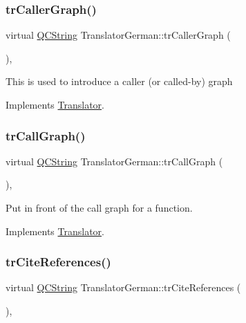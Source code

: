 \subsubsection{\texorpdfstring{trCallerGraph()}{trCallerGraph()}}
{\footnotesize\ttfamily virtual \mbox{\hyperlink{class_q_c_string}{Q\+C\+String}} Translator\+German\+::tr\+Caller\+Graph (\begin{DoxyParamCaption}{ }\end{DoxyParamCaption})\hspace{0.3cm}{\ttfamily [inline]}, {\ttfamily [virtual]}}

This is used to introduce a caller (or called-\/by) graph 

Implements \mbox{\hyperlink{class_translator}{Translator}}.

\mbox{\label{class_translator_german_af063977e045f5564f1fcaacef20dbafa}} 
\subsubsection{\texorpdfstring{trCallGraph()}{trCallGraph()}}
{\footnotesize\ttfamily virtual \mbox{\hyperlink{class_q_c_string}{Q\+C\+String}} Translator\+German\+::tr\+Call\+Graph (\begin{DoxyParamCaption}{ }\end{DoxyParamCaption})\hspace{0.3cm}{\ttfamily [inline]}, {\ttfamily [virtual]}}

Put in front of the call graph for a function. 

Implements \mbox{\hyperlink{class_translator}{Translator}}.

\mbox{\label{class_translator_german_a1125598ba94e63c406d69ca023105f68}} 
\subsubsection{\texorpdfstring{trCiteReferences()}{trCiteReferences()}}
{\footnotesize\ttfamily virtual \mbox{\hyperlink{class_q_c_string}{Q\+C\+String}} Translator\+German\+::tr\+Cite\+References (\begin{DoxyParamCaption}{ }\end{DoxyParamCaption})\hspace{0.3cm}{\ttfamily [inline]}, {\ttfamily [virtual]}}


